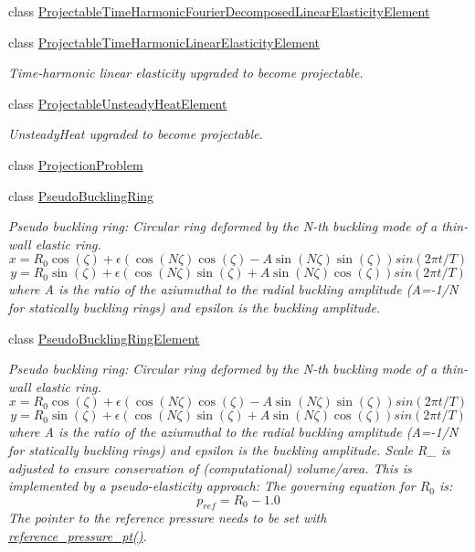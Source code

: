 \begin{DoxyCompactItemize}
class \hyperlink{classoomph_1_1ProjectableTimeHarmonicFourierDecomposedLinearElasticityElement}{Projectable\+Time\+Harmonic\+Fourier\+Decomposed\+Linear\+Elasticity\+Element}
\item 
class \hyperlink{classoomph_1_1ProjectableTimeHarmonicLinearElasticityElement}{Projectable\+Time\+Harmonic\+Linear\+Elasticity\+Element}
\begin{DoxyCompactList}\small\item\em Time-\/harmonic linear elasticity upgraded to become projectable. \end{DoxyCompactList}\item 
class \hyperlink{classoomph_1_1ProjectableUnsteadyHeatElement}{Projectable\+Unsteady\+Heat\+Element}
\begin{DoxyCompactList}\small\item\em Unsteady\+Heat upgraded to become projectable. \end{DoxyCompactList}\item 
class \hyperlink{classoomph_1_1ProjectionProblem}{Projection\+Problem}
\item 
class \hyperlink{classoomph_1_1PseudoBucklingRing}{Pseudo\+Buckling\+Ring}
\begin{DoxyCompactList}\small\item\em Pseudo buckling ring\+: Circular ring deformed by the N-\/th buckling mode of a thin-\/wall elastic ring. \[ x = R_0 \cos(\zeta) + \epsilon \left( \cos(N \zeta) \cos(\zeta) - A \sin(N \zeta) \sin(\zeta) \right) sin(2 \pi t/T) \] \[ y = R_0 \sin(\zeta) + \epsilon \left( \cos(N \zeta) \sin(\zeta) + A \sin(N \zeta) \cos(\zeta) \right) sin(2 \pi t/T) \] where A is the ratio of the aziumuthal to the radial buckling amplitude (A=-\/1/N for statically buckling rings) and epsilon is the buckling amplitude. \end{DoxyCompactList}\item 
class \hyperlink{classoomph_1_1PseudoBucklingRingElement}{Pseudo\+Buckling\+Ring\+Element}
\begin{DoxyCompactList}\small\item\em Pseudo buckling ring\+: Circular ring deformed by the N-\/th buckling mode of a thin-\/wall elastic ring. \[ x = R_0 \cos(\zeta) + \epsilon \left( \cos(N \zeta) \cos(\zeta) - A \sin(N \zeta) \sin(\zeta) \right) sin(2 \pi t/T) \] \[ y = R_0 \sin(\zeta) + \epsilon \left( \cos(N \zeta) \sin(\zeta) + A \sin(N \zeta) \cos(\zeta) \right) sin(2 \pi t/T) \] where A is the ratio of the aziumuthal to the radial buckling amplitude (A=-\/1/N for statically buckling rings) and epsilon is the buckling amplitude. Scale R\+\_ is adjusted to ensure conservation of (computational) volume/area. This is implemented by a pseudo-\/elasticity approach\+: The governing equation for $ R_0 $ is\+: \[ p_{ref} = R_0 - 1.0 \] The pointer to the reference pressure needs to be set with \hyperlink{classoomph_1_1PseudoBucklingRingElement_aee6f3e5157ff065ddc132d24496b9378}{reference\+\_\+pressure\+\_\+pt()}. \end{DoxyCompactList}\item 

\end{DoxyCompactItemize}
